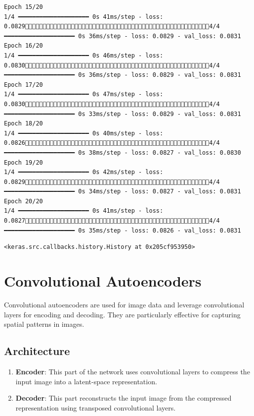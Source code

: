 \documentclass[
  letterpaper,
  DIV=11,
  numbers=noendperiod]{scrreprt}
\providecommand{\tightlist}{%
  \setlength{\itemsep}{0pt}\setlength{\parskip}{0pt}}\usepackage{longtable,booktabs,array}
\begin{document}
\begin{verbatim}
Epoch 15/20
1/4 ━━━━━━━━━━━━━━━━━━━━ 0s 41ms/step - loss: 0.08294/4 ━━━━━━━━━━━━━━━━━━━━ 0s 36ms/step - loss: 0.0829 - val_loss: 0.0831
Epoch 16/20
1/4 ━━━━━━━━━━━━━━━━━━━━ 0s 46ms/step - loss: 0.08304/4 ━━━━━━━━━━━━━━━━━━━━ 0s 36ms/step - loss: 0.0829 - val_loss: 0.0831
Epoch 17/20
1/4 ━━━━━━━━━━━━━━━━━━━━ 0s 47ms/step - loss: 0.08304/4 ━━━━━━━━━━━━━━━━━━━━ 0s 33ms/step - loss: 0.0829 - val_loss: 0.0831
Epoch 18/20
1/4 ━━━━━━━━━━━━━━━━━━━━ 0s 40ms/step - loss: 0.08264/4 ━━━━━━━━━━━━━━━━━━━━ 0s 38ms/step - loss: 0.0827 - val_loss: 0.0830
Epoch 19/20
1/4 ━━━━━━━━━━━━━━━━━━━━ 0s 42ms/step - loss: 0.08294/4 ━━━━━━━━━━━━━━━━━━━━ 0s 34ms/step - loss: 0.0827 - val_loss: 0.0831
Epoch 20/20
1/4 ━━━━━━━━━━━━━━━━━━━━ 0s 41ms/step - loss: 0.08274/4 ━━━━━━━━━━━━━━━━━━━━ 0s 35ms/step - loss: 0.0826 - val_loss: 0.0831
\end{verbatim}

\begin{verbatim}
<keras.src.callbacks.history.History at 0x205cf953950>
\end{verbatim}

\section{Convolutional Autoencoders}\label{convolutional-autoencoders}

Convolutional autoencoders are used for image data and leverage
convolutional layers for encoding and decoding. They are particularly
effective for capturing spatial patterns in images.

\subsection{Architecture}\label{architecture-2}

\begin{enumerate}
\def\labelenumi{\arabic{enumi}.}
\tightlist
\item
  \textbf{Encoder}: This part of the network uses convolutional layers
  to compress the input image into a latent-space representation.
\item
  \textbf{Decoder}: This part reconstructs the input image from the
  compressed representation using transposed convolutional layers.
\end{enumerate}
\end{document}
